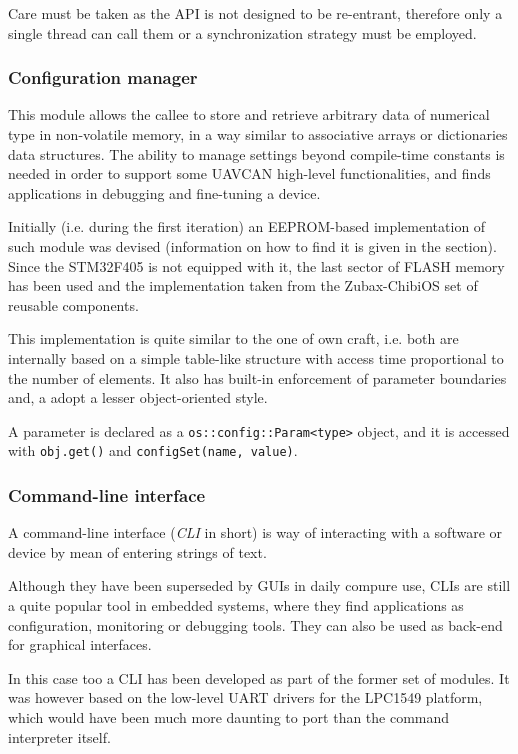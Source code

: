 Care must be taken as the API is not designed to be re-entrant, therefore only a single thread can call them or a synchronization strategy must be employed.


\subsubsection{Configuration manager}
This module allows the callee to store and retrieve arbitrary data of numerical type in non-volatile memory, in a way similar to associative arrays or dictionaries data structures.
The ability to manage settings beyond compile-time constants is needed in order to support some UAVCAN high-level functionalities, and finds applications in debugging and fine-tuning a device.

Initially (i.e. during the first iteration) an EEPROM-based implementation of such module was devised (information on how to find it is given in the  section).
Since the STM32F405 is not equipped with it, the last sector of FLASH memory has been used and the implementation taken from the Zubax-ChibiOS set of reusable components.

This implementation is quite similar to the one of own craft, i.e. both are internally based on a simple table-like structure with access time proportional to the number of elements.
It also has built-in enforcement of parameter boundaries and, a adopt a lesser object-oriented style.

A parameter is declared as a \texttt{os::config::Param<type>} object, and it is accessed with \texttt{obj.get()} and \texttt{configSet(name, value)}.


\subsubsection{Command-line interface}
A command-line interface (\emph{CLI} in short) is way of interacting with a software or device by mean of entering strings of text.

Although they have been superseded by GUIs in daily compure use, CLIs are still a quite popular tool in embedded systems, where they find applications as configuration, monitoring or debugging tools.
They can also be used as back-end for graphical interfaces.

In this case too a CLI has been developed as part of the former set of modules.
It was however based on the low-level UART drivers for the LPC1549 platform, which would have been much more daunting to port than the command interpreter itself.

